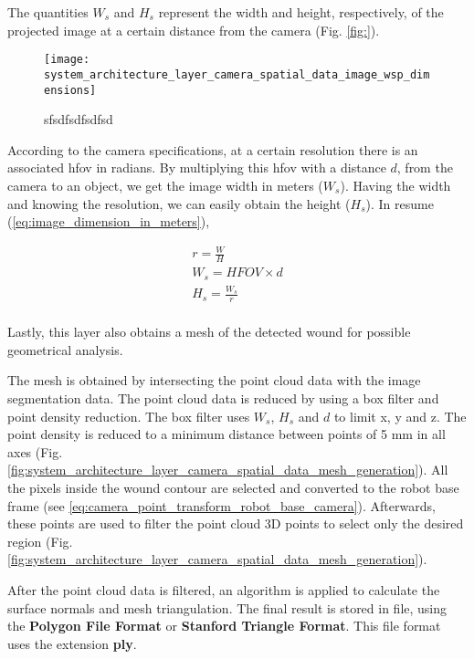 The quantities $W_s$ and $H_s$ represent the width and height, respectively, of the projected image at a certain distance from the camera (Fig. \ref{fig:}).

\begin{figure}[htbp]
	\centering
	\texttt{[image: system\_architecture\_layer\_camera\_spatial\_data\_image\_wsp\_dimensions]}
	\caption{sfsdfsdfsdfsd}
	\label{fig:system_architecture_layer_camera_spatial_data_image_wsp_dimensions}
\end{figure}

According to the camera specifications, at a certain resolution there is an associated \gls{hfov} in radians. By multiplying this \gls{hfov} with a distance $d$, from the camera to an object, we get the image width in meters ($W_s$). Having the width and knowing the resolution, we can easily obtain the height ($H_s$). In resume (\ref{eq:image_dimension_in_meters}),

\begin{equation}
\label{eq:image_dimension_in_meters}
    \left.
    \begin{aligned}
        r = \frac{W}{H} \\
        W_s = HFOV \times d \\
        H_s = \frac{W_s}{r} \\
    \end{aligned}
    \right.
\end{equation}

Lastly, this layer also obtains a mesh of the detected wound for possible geometrical analysis.

The mesh is obtained by intersecting the point cloud data with the image segmentation data. The point cloud data is reduced by using a box filter and point density reduction. The box filter uses $W_s$, $H_s$ and $d$ to limit x, y and z. The point density is reduced to a minimum distance between points of 5 \si{\milli \meter} in all axes (Fig. \ref{fig:system_architecture_layer_camera_spatial_data_mesh_generation}). All the pixels inside the wound contour are selected and converted to the robot base frame (see \ref{eq:camera_point_transform_robot_base_camera}). Afterwards, these points are used to filter the point cloud 3D points to select only the desired region (Fig. \ref{fig:system_architecture_layer_camera_spatial_data_mesh_generation}).

After the point cloud data is filtered, an algorithm is applied to calculate the surface normals and mesh triangulation. The final result is stored in file, using the \textbf{Polygon File Format} or \textbf{Stanford Triangle Format}. This file format uses the extension \textbf{ply}.

